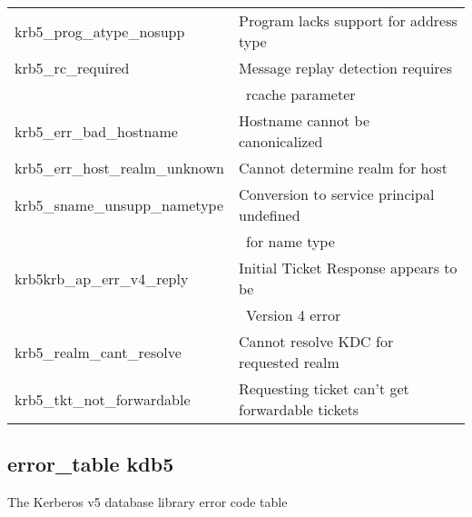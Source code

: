 \begin{small}
\begin{tabular}{ll}
{\sc krb5_prog_atype_nosupp }& Program lacks support for address type \\
{\sc krb5_rc_required }& Message replay detection requires\\&\  rcache parameter \\
{\sc krb5_err_bad_hostname }& Hostname cannot be canonicalized \\
{\sc krb5_err_host_realm_unknown }& Cannot determine realm for host \\
{\sc krb5_sname_unsupp_nametype }& Conversion to service principal undefined\\&\ for name type \\
{\sc krb5krb_ap_err_v4_reply }& Initial Ticket Response appears to be\\
&\ Version 4 error \\
{\sc krb5_realm_cant_resolve }& Cannot resolve KDC for requested realm \\
{\sc krb5_tkt_not_forwardable }& Requesting ticket can't get forwardable tickets \\
\end{tabular}
\end{small}

\subsection{error_table kdb5}


The Kerberos v5 database library error code table


